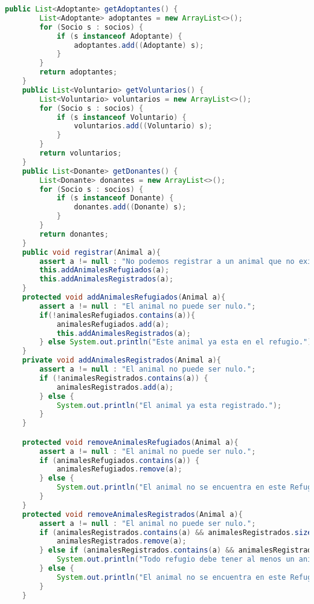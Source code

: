 \begin{lstlisting}[style = javaNormal, language=Java]
    public List<Adoptante> getAdoptantes() {
        List<Adoptante> adoptantes = new ArrayList<>();
        for (Socio s : socios) {
            if (s instanceof Adoptante) {
                adoptantes.add((Adoptante) s);
            }
        }
        return adoptantes;
    }
    public List<Voluntario> getVoluntarios() {
        List<Voluntario> voluntarios = new ArrayList<>();
        for (Socio s : socios) {
            if (s instanceof Voluntario) {
                voluntarios.add((Voluntario) s);
            }
        }
        return voluntarios;
    }
    public List<Donante> getDonantes() {
        List<Donante> donantes = new ArrayList<>();
        for (Socio s : socios) {
            if (s instanceof Donante) {
                donantes.add((Donante) s);
            }
        }
        return donantes;
    }
    public void registrar(Animal a){
        assert a != null : "No podemos registrar a un animal que no existe";
        this.addAnimalesRefugiados(a);
        this.addAnimalesRegistrados(a);
    }
    protected void addAnimalesRefugiados(Animal a){
        assert a != null : "El animal no puede ser nulo.";
        if(!animalesRefugiados.contains(a)){
            animalesRefugiados.add(a);
            this.addAnimalesRegistrados(a);
        } else System.out.println("Este animal ya esta en el refugio.");
    }
    private void addAnimalesRegistrados(Animal a){
        assert a != null : "El animal no puede ser nulo.";
        if (!animalesRegistrados.contains(a)) {
            animalesRegistrados.add(a);
        } else {
            System.out.println("El animal ya esta registrado.");
        }
    }

    protected void removeAnimalesRefugiados(Animal a){
        assert a != null : "El animal no puede ser nulo.";
        if (animalesRefugiados.contains(a)) {
            animalesRefugiados.remove(a);
        } else {
            System.out.println("El animal no se encuentra en este Refugio.");
        }
    }
    protected void removeAnimalesRegistrados(Animal a){
        assert a != null : "El animal no puede ser nulo.";
        if (animalesRegistrados.contains(a) && animalesRegistrados.size() > 1) {
            animalesRegistrados.remove(a);
        } else if (animalesRegistrados.contains(a) && animalesRegistrados.size() == 1) {
            System.out.println("Todo refugio debe tener al menos un animal registrado, estas intentando eliminar el unico animal existente.");
        } else {
            System.out.println("El animal no se encuentra en este Refugio.");
        }
    }


\end{lstlisting}
